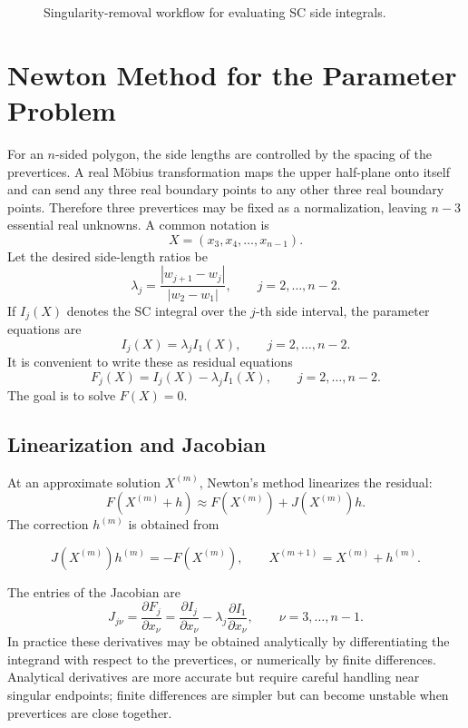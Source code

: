 \documentclass[12pt,a4paper]{article}
\begin{document}
\begin{figure}[H]
\centering
{}
\caption{Singularity-removal workflow for evaluating SC side integrals.}
\end{figure}

\section{Newton Method for the Parameter Problem}

For an \(n\)-sided polygon, the side lengths are controlled by the spacing of the prevertices. A real Möbius transformation maps the upper half-plane onto itself and can send any three real boundary points to any other three real boundary points. Therefore three prevertices may be fixed as a normalization, leaving \(n-3\) essential real unknowns. A common notation is
\[
X=(x_3,x_4,\ldots,x_{n-1}).
\]
Let the desired side-length ratios be
\[
\lambda_j=\frac{|w_{j+1}-w_j|}{|w_2-w_1|},\qquad j=2,\ldots,n-2.
\]
If \(I_j(X)\) denotes the SC integral over the \(j\)-th side interval, the parameter equations are
\[
I_j(X)=\lambda_j I_1(X),\qquad j=2,\ldots,n-2.
\]
It is convenient to write these as residual equations
\[
F_j(X)=I_j(X)-\lambda_j I_1(X),\qquad j=2,\ldots,n-2.
\]
The goal is to solve \(F(X)=0\).

\subsection{Linearization and Jacobian}

At an approximate solution \(X^{(m)}\), Newton's method linearizes the residual:
\[
F(X^{(m)}+h)\approx F(X^{(m)})+J(X^{(m)})h.
\]
The correction \(h^{(m)}\) is obtained from
\begin{formulabox}
\[
J(X^{(m)})h^{(m)}=-F(X^{(m)}),\qquad X^{(m+1)}=X^{(m)}+h^{(m)}.
\]
\end{formulabox}
The entries of the Jacobian are
\[
J_{j\nu}=\frac{\partial F_j}{\partial x_\nu}
=\frac{\partial I_j}{\partial x_\nu}
-\lambda_j\frac{\partial I_1}{\partial x_\nu},
\qquad \nu=3,\ldots,n-1.
\]
In practice these derivatives may be obtained analytically by differentiating the integrand with respect to the prevertices, or numerically by finite differences. Analytical derivatives are more accurate but require careful handling near singular endpoints; finite differences are simpler but can become unstable when prevertices are close together.
\end{document}
